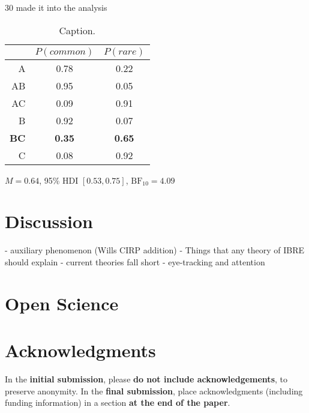 \documentclass[10pt,letterpaper]{article}
\begin{document}
30 made it into the analysis

\begin{table}[H]
  \begin{center}
    \caption{Caption.\\}
    \label{tab:results-exp2}
    \vskip 0.12in
    \begin{tabular}{rcc}
      \hline
       & $P(common)$ & $P(rare)$ \\
      \hline
      A & 0.78 & 0.22  \\
      AB & 0.95 & 0.05 \\
      AC & 0.09 & 0.91 \\
      B & 0.92 & 0.07  \\
      \textbf{BC} & \textbf{0.35} & \textbf{0.65} \\
      C & 0.08 & 0.92 \\
    \end{tabular}
  \end{center}
\end{table}

$M = 0.64$, 95\% HDI $[0.53, 0.75]$, $\mathrm{BF}_{10} = 4.09$

\section{Discussion}

- auxiliary phenomenon (Wills CIRP addition)
- Things that any theory of IBRE should explain
- current theories fall short
- eye-tracking and attention

\section{Open Science}

\section{Acknowledgments}

In the \textbf{initial submission}, please \textbf{do not include
  acknowledgements}, to preserve anonymity.  In the \textbf{final submission},
place acknowledgments (including funding information) in a section \textbf{at
the end of the paper}.



\setlength{\bibleftmargin}{.125in}
\setlength{\bibindent}{-\bibleftmargin}


\end{document}
